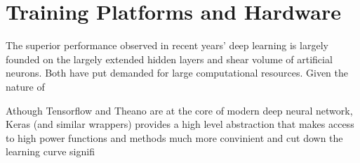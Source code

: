 \section{Training Platforms and Hardware}
The superior performance observed in recent years' deep learning is largely founded on the largely extended hidden layers and shear volume of artificial neurons. Both have put demanded for large computational resources. Given the nature of

Athough Tensorflow and Theano are at the core of modern deep neural network, Keras (and similar wrappers) provides a high level abstraction that makes access to high power functions and methods much more convinient and cut down the learning curve signifi 